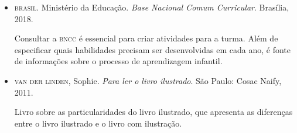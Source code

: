 \documentclass[11pt]{extarticle}
\begin{document}
\begin{itemize}
\item \textsc{brasil}. Ministério da Educação. \textit{Base Nacional Comum Curricular}. Brasília, 2018.

Consultar a \textsc{bncc} é essencial para criar atividades para a turma. Além de especificar 
quais habilidades precisam ser desenvolvidas em cada ano, é fonte de informações sobre 
o processo de aprendizagem infantil. 

 
\item \textsc{van der linden}, Sophie. \textit{Para ler o livro ilustrado}. São Paulo: Cosac Naify, 2011.

Livro sobre as particularidades do livro ilustrado, que apresenta as diferenças entre o livro ilustrado e o livro com ilustração. 
\end{itemize}
\end{document}
